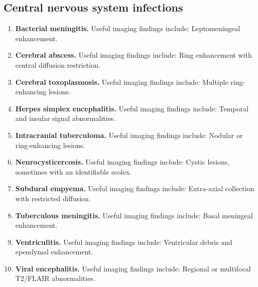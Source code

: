 \subsection{Central nervous system infections}
\begin{enumerate}[leftmargin=*,itemsep=0.45em,topsep=0.4em]
\item \textbf{Bacterial meningitis.} Useful imaging findings include: Leptomeningeal enhancement.
\item \textbf{Cerebral abscess.} Useful imaging findings include: Ring enhancement with central diffusion restriction.
\item \textbf{Cerebral toxoplasmosis.} Useful imaging findings include: Multiple ring-enhancing lesions.
\item \textbf{Herpes simplex encephalitis.} Useful imaging findings include: Temporal and insular signal abnormalities.
\item \textbf{Intracranial tuberculoma.} Useful imaging findings include: Nodular or ring-enhancing lesions.
\item \textbf{Neurocysticercosis.} Useful imaging findings include: Cystic lesions, sometimes with an identifiable scolex.
\item \textbf{Subdural empyema.} Useful imaging findings include: Extra-axial collection with restricted diffusion.
\item \textbf{Tuberculous meningitis.} Useful imaging findings include: Basal meningeal enhancement.
\item \textbf{Ventriculitis.} Useful imaging findings include: Ventricular debris and ependymal enhancement.
\item \textbf{Viral encephalitis.} Useful imaging findings include: Regional or multifocal T2/FLAIR abnormalities.
\end{enumerate}

